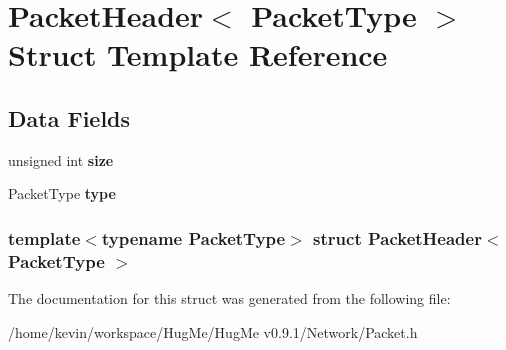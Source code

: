 \hypertarget{structPacketHeader}{
\section{PacketHeader$<$ PacketType $>$ Struct Template Reference}
\label{structPacketHeader}
}
\subsection*{Data Fields}
\begin{DoxyCompactItemize}
\item 
\hypertarget{structPacketHeader_aa9dea8d798186486a554a72e5cccf251}{
unsigned int {\bfseries size}}
\label{structPacketHeader_aa9dea8d798186486a554a72e5cccf251}

\item 
\hypertarget{structPacketHeader_a05d799894147a984d82cf048788df180}{
PacketType {\bfseries type}}
\label{structPacketHeader_a05d799894147a984d82cf048788df180}

\end{DoxyCompactItemize}
\subsubsection*{template$<$typename PacketType$>$ struct PacketHeader$<$ PacketType $>$}



The documentation for this struct was generated from the following file:\begin{DoxyCompactItemize}
\item 
/home/kevin/workspace/HugMe/HugMe v0.9.1/Network/Packet.h\end{DoxyCompactItemize}
